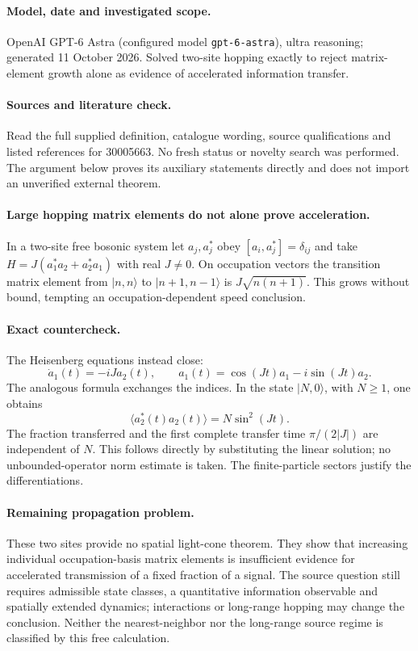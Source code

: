 \documentclass[11pt]{article}
\begin{document}
\paragraph{Model, date and investigated scope.}
OpenAI GPT-6 Astra (configured model \texttt{gpt-6-astra}), ultra reasoning; generated 11 October 2026. Solved two-site hopping exactly to reject matrix-element growth alone as evidence of accelerated information transfer.

\paragraph{Sources and literature check.}
Read the full supplied definition, catalogue wording, source qualifications and listed references for 30005663. No fresh status or novelty search was performed. The argument below proves its auxiliary statements directly and does not import an unverified external theorem.

\paragraph{Large hopping matrix elements do not alone prove acceleration.} In a two-site free bosonic system let \(a_j,a_j^*\) obey \([a_i,a_j^*]=\delta_{ij}\) and take \(H=J(a_1^*a_2+a_2^*a_1)\) with real \(J\ne0\). On occupation vectors the transition matrix element from \(|n,n\rangle\) to \(|n+1,n-1\rangle\) is \(J\sqrt{n(n+1)}\). This grows without bound, tempting an occupation-dependent speed conclusion.
\paragraph{Exact countercheck.} The Heisenberg equations instead close:
\[
 \dot a_1(t)=-iJ a_2(t),\qquad
 a_1(t)=\cos(Jt)a_1-i\sin(Jt)a_2.
\]
The analogous formula exchanges the indices. In the state \(|N,0\rangle\), with \(N\geq1\), one obtains
\[
 \langle a_2^*(t)a_2(t)\rangle=N\sin^2(Jt).
\]
The fraction transferred and the first complete transfer time \(\pi/(2|J|)\) are independent of \(N\). This follows directly by substituting the linear solution; no unbounded-operator norm estimate is taken. The finite-particle sectors justify the differentiations.
\paragraph{Remaining propagation problem.} These two sites provide no spatial light-cone theorem. They show that increasing individual occupation-basis matrix elements is insufficient evidence for accelerated transmission of a fixed fraction of a signal. The source question still requires admissible state classes, a quantitative information observable and spatially extended dynamics; interactions or long-range hopping may change the conclusion. Neither the nearest-neighbor nor the long-range source regime is classified by this free calculation.
\end{document}
